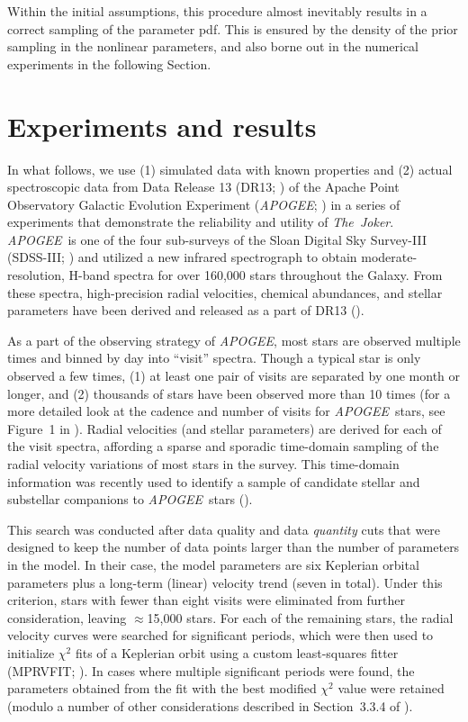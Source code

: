 \documentclass[manuscript, letterpaper]{aastex6}
\newcommand{\project}[1]{\textsl{#1}}
\newcommand{\acronym}[1]{{\small{#1}}}
\newcommand{\apogee}{\project{\acronym{APOGEE}}}
\newcommand{\samplername}{\project{The~Joker}}
\newcommand{\sectionname}{Section}
\newcommand{\figname}{Figure}
\begin{document}
Within the initial assumptions, this procedure almost inevitably results in a
correct sampling of the parameter pdf. This is ensured by the density of the
prior sampling in the nonlinear parameters, and also borne out in the numerical experiments
in the following \sectionname.

\section{Experiments and results} \label{sec:experiments}

In what follows, we use (1) simulated data with known properties and (2) actual
spectroscopic data from Data Release 13 (DR13;
\citealt{SDSS-Collaboration:2016}) of the Apache Point Observatory Galactic
Evolution Experiment (\apogee; \citealt{Majewski:2015}) in a series of
experiments that demonstrate the reliability and utility of \samplername.
\apogee\ is one of the four sub-surveys of the Sloan Digital Sky Survey-III
(SDSS-III; \citealt{Eisenstein:2011}) and utilized a new infrared spectrograph
to obtain moderate-resolution, H-band spectra for over 160,000 stars throughout
the Galaxy.
From these spectra, high-precision radial velocities, chemical abundances, and
stellar parameters have been derived and released as a part of DR13
(\citealt{Holtzman:2015,Nidever:2015}).

As a part of the observing strategy of \apogee, most stars are observed
multiple times and binned by day into ``visit'' spectra.
Though a typical star is only observed a few times, (1) at least one pair of
visits are separated by one month or longer, and (2) thousands of stars have
been observed more than 10 times (for a more detailed look at the cadence and
number of visits for \apogee\ stars, see \figname~1 in \citealt{Troup:2016}).
Radial velocities (and stellar parameters) are derived for each of the visit
spectra, affording a sparse and sporadic time-domain sampling of the radial
velocity variations of most stars in the survey.
This time-domain information was recently used to identify a sample of
candidate stellar and substellar companions to \apogee\ stars
(\citealt{Troup:2016}).

This search was conducted after data quality and data \emph{quantity} cuts that
were designed to keep the number of data points larger than the number of
parameters in the model.
In their case, the model parameters are six Keplerian orbital parameters plus a
long-term (linear) velocity trend (seven in total).
Under this criterion, stars with fewer than eight visits were eliminated from further
consideration, leaving $\approx$15,000 stars.
For each of the remaining stars, the radial velocity curves were searched for
significant periods, which were then used to initialize $\chi^2$ fits of a
Keplerian orbit using a custom least-squares fitter (\acronym{MPRVFIT};
\citealt{De-Lee:2013}).
In cases where multiple significant periods were found, the parameters obtained
from the fit with the best modified $\chi^2$ value were retained (modulo a
number of other considerations described in \sectionname~3.3.4 of
\citealt{Troup:2016}).
\end{document}
